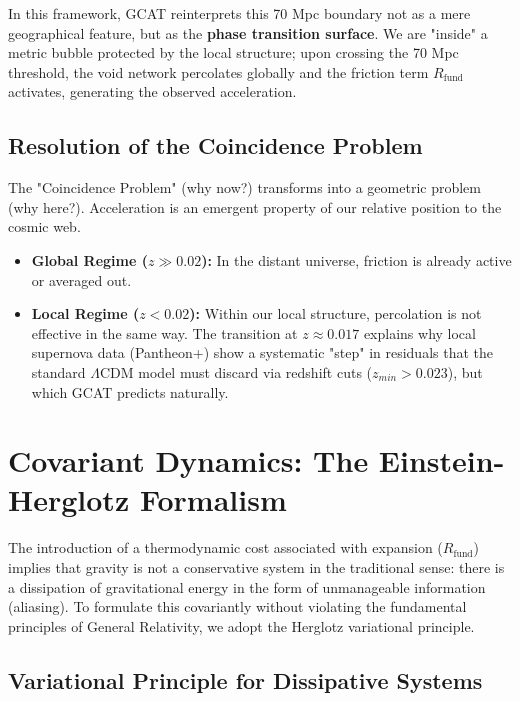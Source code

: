 \documentclass[12pt, a4paper]{article}
\theoremstyle{plain}
\theoremstyle{definition}
\begin{document}
In this framework, GCAT reinterprets this 70 Mpc boundary not as a mere geographical feature, but as the \textbf{phase transition surface}. We are "inside" a metric bubble protected by the local structure; upon crossing the 70 Mpc threshold, the void network percolates globally and the friction term $R_{\text{fund}}$ activates, generating the observed acceleration.

\subsection{Resolution of the Coincidence Problem}

The "Coincidence Problem" (why now?) transforms into a geometric problem (why here?). Acceleration is an emergent property of our relative position to the cosmic web.

\begin{itemize}
    \item \textbf{Global Regime ($z \gg 0.02$):} In the distant universe, friction is already active or averaged out.
    \item \textbf{Local Regime ($z < 0.02$):} Within our local structure, percolation is not effective in the same way. The transition at \textbf{$z \approx 0.017$} explains why local supernova data (Pantheon+) show a systematic "step" in residuals that the standard $\Lambda$CDM model must discard via redshift cuts ($z_{min} > 0.023$), but which GCAT predicts naturally.
\end{itemize}

\section{Covariant Dynamics: The Einstein-Herglotz Formalism}
\label{sec:dynamics}

The introduction of a thermodynamic cost associated with expansion ($R_{\text{fund}}$) implies that gravity is not a conservative system in the traditional sense: there is a dissipation of gravitational energy in the form of unmanageable information (aliasing). To formulate this covariantly without violating the fundamental principles of General Relativity, we adopt the Herglotz variational principle.

\subsection{Variational Principle for Dissipative Systems}
\end{document}
